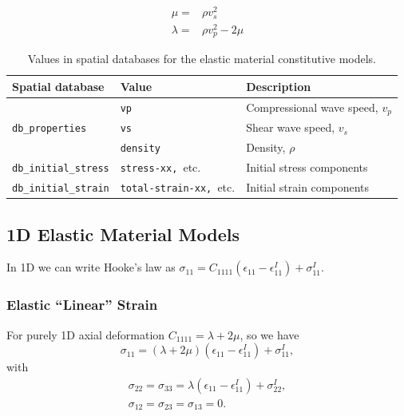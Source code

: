 \begin{equation}
\begin{aligned}\mu= & \rho v_{s}^{2}\\
\lambda= & \rho v_{p}^{2}-2\mu
\end{aligned}
\label{eq:4}
\end{equation}


\noindent \begin{center}
\begin{table}[H]
\noindent \begin{centering}
\caption{Values in spatial databases for the elastic material constitutive
models.}

\par\end{centering}

\noindent \centering{}%
\begin{tabular}{|l|l|l|}
\hline 
\textbf{Spatial database} & \textbf{Value} & \textbf{Description}\tabularnewline
\hline 
\hline 
\multirow{3}{*}{\texttt{db\_properties}} & \texttt{vp} & Compressional wave speed, $v_{p}$\tabularnewline
\cline{2-3} 
 & \texttt{vs} & Shear wave speed, $v_{s}$\tabularnewline
\cline{2-3} 
 & \texttt{density} & Density, $\rho$\tabularnewline
\hline 
\texttt{db\_initial\_stress} & \texttt{stress-xx, }etc. & Initial stress components\tabularnewline
\hline 
\texttt{db\_initial\_strain} & \texttt{total-strain-xx, }etc. & Initial strain components\tabularnewline
\hline 
\end{tabular}
\end{table}

\par\end{center}


\subsection{1D Elastic Material Models}

In 1D we can write Hooke's law as $\sigma_{11}=C_{1111}\left(\epsilon_{11}-\epsilon_{11}^{I}\right)+\sigma_{11}^{I}$.


\subsubsection{Elastic ``Linear'' Strain}

For purely 1D axial deformation $C_{1111}=\lambda+2\mu$, so we have
\begin{equation}
\sigma_{11}=(\lambda+2\mu)\left(\epsilon_{11}-\epsilon_{11}^{I}\right)+\sigma_{11}^{I},\label{eq:5}
\end{equation}
with
\begin{gather}
\sigma_{22}=\sigma_{33}=\lambda\left(\epsilon_{11}-\epsilon_{11}^{I}\right)+\sigma_{22}^{I},\nonumber \\
\sigma_{12}=\sigma_{23}=\sigma_{13}=0.\label{eq:6}
\end{gather}



